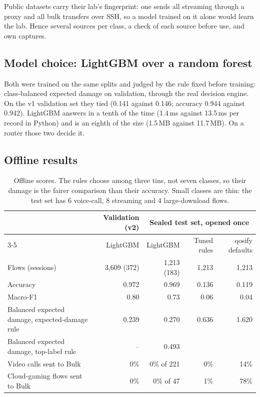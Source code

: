 \documentclass[11pt,a4paper]{article}
\begin{document}
Public datasets carry their lab's fingerprint: one sends all streaming through a proxy and all bulk transfers over SSH, so a model trained on it alone would learn the lab. Hence several sources per class, a check of each source before use, and own captures.

\subsection{Model choice: LightGBM over a random forest}
Both were trained on the same splits and judged by the rule fixed before training: class-balanced expected damage on validation, through the real decision engine. On the v1 validation set they tied (0.141 against 0.146; accuracy 0.944 against 0.942). LightGBM answers in a tenth of the time (1.4\,ms against 13.5\,ms per record in Python) and is an eighth of the size (1.5\,MB against 11.7\,MB). On a router those two decide it.

\subsection{Offline results}
\begin{table}[H]\centering\small
\begin{tabular}{@{}lrrrr@{}}
\toprule
 & Validation (v2) & \multicolumn{3}{c}{Sealed test set, opened once} \\
\cmidrule(l){3-5}
 & LightGBM & LightGBM & Tuned rules & qosify defaults \\
\midrule
Flows (sessions) & 3,609 (372) & 1,213 (183) & 1,213 & 1,213 \\
Accuracy & 0.972 & 0.969 & 0.136 & 0.119 \\
Macro-F1 & 0.80 & 0.73 & 0.06 & 0.04 \\
Balanced expected damage, expected-damage rule & 0.239 & 0.270 & 0.636 & 1.620 \\
Balanced expected damage, top-label rule & -- & 0.493 & & \\
Video calls sent to Bulk & 0\% & 0\% of 221 & 0\% & 14\% \\
Cloud-gaming flows sent to Bulk & 0\% & 0\% of 47 & 1\% & 78\% \\
\bottomrule
\end{tabular}
\caption{Offline scores. The rules choose among three tins, not seven classes, so their damage is the fairer comparison than their accuracy. Small classes are thin: the test set has 6 voice-call, 8 streaming and 4 large-download flows.}
\end{table}
\end{document}
